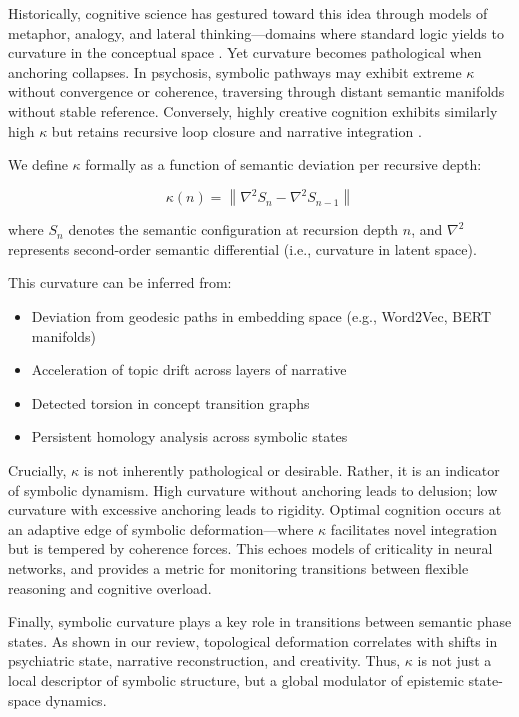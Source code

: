 Historically, cognitive science has gestured toward this idea through models of metaphor, analogy, and lateral thinking—domains where standard logic yields to curvature in the conceptual space \cite{gentner1983structure, hofstadter2007metamagical}. Yet curvature becomes pathological when anchoring collapses. In psychosis, symbolic pathways may exhibit extreme $\kappa$ without convergence or coherence, traversing through distant semantic manifolds without stable reference. Conversely, highly creative cognition exhibits similarly high $\kappa$ but retains recursive loop closure and narrative integration \cite{silverman2009giftedness, wang2018computational}.

We define $\kappa$ formally as a function of semantic deviation per recursive depth:

\[
\kappa(n) = \left\| \nabla^2 S_n - \nabla^2 S_{n-1} \right\|
\]

where $S_n$ denotes the semantic configuration at recursion depth $n$, and $\nabla^2$ represents second-order semantic differential (i.e., curvature in latent space).

This curvature can be inferred from:
\begin{itemize}
\item Deviation from geodesic paths in embedding space (e.g., Word2Vec, BERT manifolds)
\item Acceleration of topic drift across layers of narrative
\item Detected torsion in concept transition graphs
\item Persistent homology analysis across symbolic states \cite{giusti2016two, saggar2018towards}
\end{itemize}

Crucially, $\kappa$ is not inherently pathological or desirable. Rather, it is an indicator of symbolic dynamism. High curvature without anchoring leads to delusion; low curvature with excessive anchoring leads to rigidity. Optimal cognition occurs at an adaptive edge of symbolic deformation—where $\kappa$ facilitates novel integration but is tempered by coherence forces. This echoes models of criticality in neural networks, and provides a metric for monitoring transitions between flexible reasoning and cognitive overload.

Finally, symbolic curvature plays a key role in transitions between semantic phase states. As shown in our review, topological deformation correlates with shifts in psychiatric state, narrative reconstruction, and creativity. Thus, $\kappa$ is not just a local descriptor of symbolic structure, but a global modulator of epistemic state-space dynamics.

